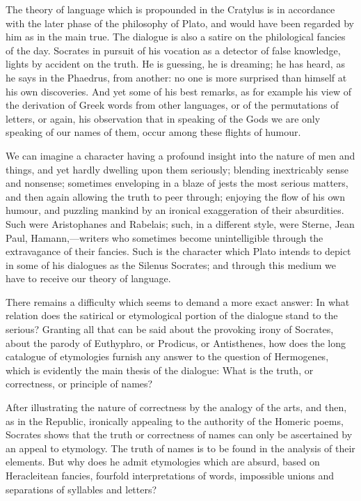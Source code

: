 \documentclass[11pt,letter]{article}
\begin{document}
\par  The theory of language which is propounded in the Cratylus is in accordance with the later phase of the philosophy of Plato, and would have been regarded by him as in the main true. The dialogue is also a satire on the philological fancies of the day. Socrates in pursuit of his vocation as a detector of false knowledge, lights by accident on the truth. He is guessing, he is dreaming; he has heard, as he says in the Phaedrus, from another: no one is more surprised than himself at his own discoveries. And yet some of his best remarks, as for example his view of the derivation of Greek words from other languages, or of the permutations of letters, or again, his observation that in speaking of the Gods we are only speaking of our names of them, occur among these flights of humour.

\par  We can imagine a character having a profound insight into the nature of men and things, and yet hardly dwelling upon them seriously; blending inextricably sense and nonsense; sometimes enveloping in a blaze of jests the most serious matters, and then again allowing the truth to peer through; enjoying the flow of his own humour, and puzzling mankind by an ironical exaggeration of their absurdities. Such were Aristophanes and Rabelais; such, in a different style, were Sterne, Jean Paul, Hamann,—writers who sometimes become unintelligible through the extravagance of their fancies. Such is the character which Plato intends to depict in some of his dialogues as the Silenus Socrates; and through this medium we have to receive our theory of language.

\par  There remains a difficulty which seems to demand a more exact answer: In what relation does the satirical or etymological portion of the dialogue stand to the serious? Granting all that can be said about the provoking irony of Socrates, about the parody of Euthyphro, or Prodicus, or Antisthenes, how does the long catalogue of etymologies furnish any answer to the question of Hermogenes, which is evidently the main thesis of the dialogue: What is the truth, or correctness, or principle of names?

\par  After illustrating the nature of correctness by the analogy of the arts, and then, as in the Republic, ironically appealing to the authority of the Homeric poems, Socrates shows that the truth or correctness of names can only be ascertained by an appeal to etymology. The truth of names is to be found in the analysis of their elements. But why does he admit etymologies which are absurd, based on Heracleitean fancies, fourfold interpretations of words, impossible unions and separations of syllables and letters?
\end{document}

